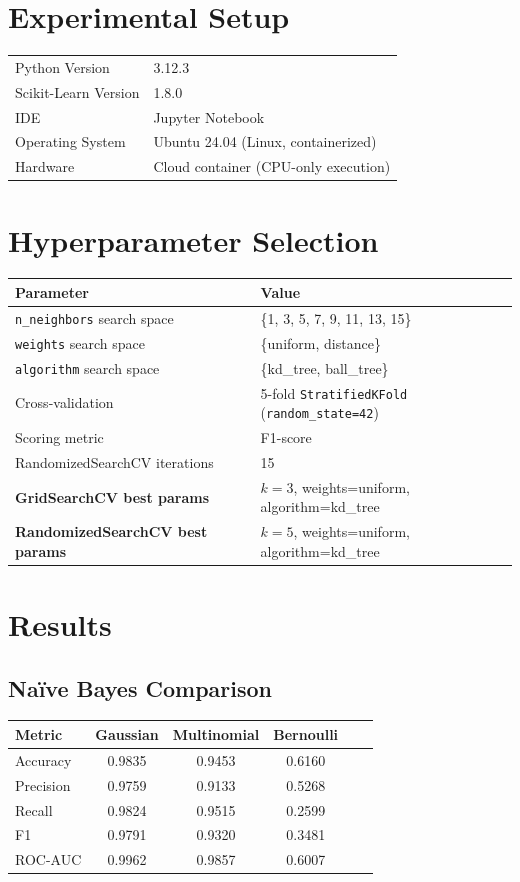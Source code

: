 \documentclass[12pt,a4paper]{article}
\begin{document}
\section{Experimental Setup}
\begin{tabular}{ll}
\toprule
Python Version & 3.12.3 \\
Scikit-Learn Version & 1.8.0 \\
IDE & Jupyter Notebook \\
Operating System & Ubuntu 24.04 (Linux, containerized) \\
Hardware & Cloud container (CPU-only execution) \\
\bottomrule
\end{tabular}

\section{Hyperparameter Selection}

\begin{tabular}{ll}
\toprule
Parameter & Value\\
\midrule
\texttt{n\_neighbors} search space & \{1, 3, 5, 7, 9, 11, 13, 15\} \\
\texttt{weights} search space & \{uniform, distance\} \\
\texttt{algorithm} search space & \{kd\_tree, ball\_tree\} \\
Cross-validation & 5-fold \texttt{StratifiedKFold} (\texttt{random\_state=42}) \\
Scoring metric & F1-score \\
RandomizedSearchCV iterations & 15 \\
\textbf{GridSearchCV best params} & $k=3$, weights=uniform, algorithm=kd\_tree \\
\textbf{RandomizedSearchCV best params} & $k=5$, weights=uniform, algorithm=kd\_tree \\
\bottomrule
\end{tabular}

\section{Results}

\subsection*{Na\"ive Bayes Comparison}
\begin{tabular}{lccccc}
\toprule
Metric & Gaussian & Multinomial & Bernoulli \\
\midrule
Accuracy  & 0.9835 & 0.9453 & 0.6160 \\
Precision & 0.9759 & 0.9133 & 0.5268 \\
Recall    & 0.9824 & 0.9515 & 0.2599 \\
F1        & 0.9791 & 0.9320 & 0.3481 \\
ROC-AUC   & 0.9962 & 0.9857 & 0.6007 \\
\bottomrule
\end{tabular}
\end{document}
